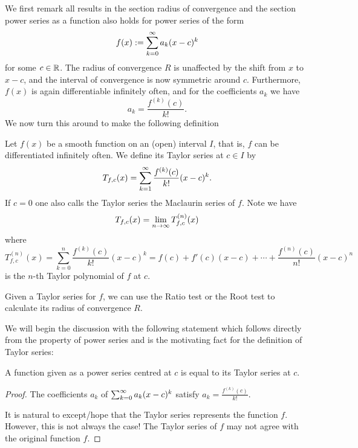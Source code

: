 \documentclass[10pt, a4paper]{article}
\begin{document}
We first remark all results in the section radius of convergence and the section power series as a function also holds for power series of the form
\[
f(x) := \sum_{k = 0}^{\infty} a_k(x - c) ^ k
\]
for some $c \in \mathbb{R}$.
The radius of convergence $R$ is unaffected by the shift from $x$ to $x - c$,
and the interval of convergence is now symmetric around $c$.
Furthermore,
$f(x)$ is again differentiable infinitely often,
and for the coefficients $a_k$ we have
\[
a_k = \frac{f ^ {(k)}(c)}{k!}.
\]
We now turn this around to make the following definition

\begin{definition}
    Let $f(x)$ be a smooth function on an
    (open)
    interval $I$,
    that is,
    $f$ can be differentiated infinitely often.
    We define its Taylor series at $c \in I$ by
    \[
    T_{f, c}(x) = \sum_{k = 1}^{\infty}\frac{f ^ {(k)}(c)}{k!}(x - c) ^ k.
    \]
    If $c = 0$ one also calls the Taylor series the Maclaurin series of $f$.
    Note we have
    \[
    T_{f, c}(x) = \lim_{n \rightarrow \infty} T_{f, c} ^ {(n)}(x)
    \]
    where
    \[
    T_{f, c}^{(n)}(x) = \sum_{k = 0}^{n}\frac{f ^ {(k)}(c)}{k!}(x - c) ^ k = f(c) + f'(c)(x - c) + \dotsi + \frac{f ^ {(n)}(c)}{n!}(x - c) ^ n
    \]
    is the $n$-th Taylor polynomial of $f$ at $c$.
\end{definition}

Given a Taylor series for $f$,
we can use the Ratio test or the Root test to calculate its radius of convergence $R$.

We will begin the discussion with the following statement which follows directly from the property of power series and is the motivating fact for the definition of Taylor series:
\begin{proposition}
    A function given as a power series centred at $c$ is equal to its Taylor series at $c$.
    \begin{proof}
        The coefficients $a_k$ of $\sum_{k = 0}^{\infty} a_k(x - c) ^ k$ satisfy $a_k = \frac{f ^ {(k)}(c)}{k!}$.

        It is natural to except/hope that the Taylor series represents the function $f$.
        However,
        this is not always the case!
        The Taylor series of $f$ may not agree with the original function $f$.
    \end{proof}
\end{proposition}
\end{document}
